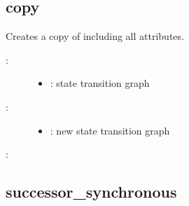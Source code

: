 \documentclass[letterpaper,10pt,english]{sphinxmanual}
\begin{document}
\subsection{copy}
\label{\detokenize{StateTransitionGraphs:stg-copy}}\label{\detokenize{StateTransitionGraphs:copy}}

\begin{fulllineitems}
\label{\detokenize{StateTransitionGraphs:PyBoolNet.StateTransitionGraphs.copy}}
Creates a copy of  including all  attributes.
\begin{description}
\item[{:}] \leavevmode\begin{itemize}
\item {} 
: state transition graph

\end{itemize}

\item[{:}] \leavevmode\begin{itemize}
\item {} 
: new state transition graph

\end{itemize}

\end{description}

:

\begin{sphinxVerbatim}[commandchars=\\\{\}]
  
\end{sphinxVerbatim}

\end{fulllineitems}



\subsection{successor\_synchronous}
\label{\detokenize{StateTransitionGraphs:id3}}\label{\detokenize{StateTransitionGraphs:successor-synchronous}}
\end{document}
